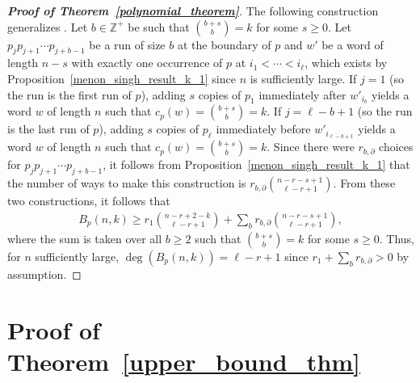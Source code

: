 \documentclass[11pt]{amsart}
\newcommand{\ZZ}{\mathbb{Z}}
\begin{document}
\begin{proof}[\textbf{Proof of Theorem~\ref{polynomial_theorem}}]
    The following construction generalizes \cite[Construction 3.2]{subseq_freq}. Let $b\in\ZZ^+$ be such that ${b+s\choose b}=k$ for some $s\geq0$. Let $p_jp_{j+1}\cdots p_{j+b-1}$ be a run of size $b$ at the boundary of $p$ and $w'$ be a word of length $n-s$ with exactly one occurrence of $p$ at $i_{1}<\cdots<i_{\ell}$, which exists by Proposition~\ref{menon_singh_result_k_1} since $n$ is sufficiently large. If $j=1$ (so the run is the first run of $p$), adding $s$ copies of $p_1$ immediately after $w'_{i_b}$ yields a word $w$ of length $n$ such that $c_p(w)={b+s\choose b}=k$. If $j=\ell-b+1$ (so the run is the last run of $p$), adding $s$ copies of $p_{\ell}$ immediately before $w'_{i_{\ell-b+1}}$ yields a word $w$ of length $n$ such that $c_p(w)={b+s\choose b}=k$. Since there were $r_{b,\partial}$ choices for $p_jp_{j+1}\cdots p_{j+b-1}$, it follows from Proposition~\ref{menon_singh_result_k_1} that the number of ways to make this construction is $r_{b,\partial}{n-r-s+1\choose \ell-r+1}$. From these two constructions, it follows that
    \begin{align*}
        B_p(n,k)\geq r_1{n-r+2-k\choose \ell-r+1}+\sum_{b}r_{b,\partial}{n-r-s+1\choose \ell-r+1},
    \end{align*}
    where the sum is taken over all $b\geq2$ such that ${b+s\choose b}=k$ for some $s\geq0$. Thus, for $n$ sufficiently large, $\deg(B_p(n,k))=\ell-r+1$ since $r_1+\sum_{b} r_{b,\partial}>0$ by assumption.
\end{proof}







\section{Proof of Theorem~\ref{upper_bound_thm}}\label{section_3}
\end{document}
